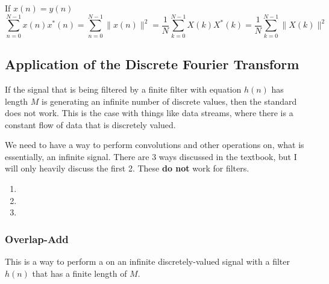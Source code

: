 If $x(n) = y(n)$
\begin{equation}\label{eq:DFT_Properties-Parsevals_Theorem-Magnitude}
  \sum\limits_{n=0}^{N-1}x(n) x^{*}(n) = \sum\limits_{n=0}^{N-1} \lVert x(n) \rVert^{2} = \frac{1}{N} \sum\limits_{k=0}^{N-1} X(k)X^{*}(k) = \frac{1}{N} \sum\limits_{k=0}^{N-1} \lVert X(k) \rVert^{2}
\end{equation}

\subsection{Application of the Discrete Fourier Transform}\label{subsec:DFT_Application}
If the signal that is being filtered by a finite filter with equation $h(n)$ has length $M$ is generating an infinite number of discrete values, then the standard  does not work.
This is the case with things like data streams, where there is a constant flow of data that is discretely valued.

We need to have a way to perform convolutions and other operations on, what is essentially, an infinite signal.
There are 3 ways discussed in the textbook, but I will only heavily discuss the first 2.
These \textbf{do not} work for  filters.
\begin{enumerate}[noitemsep]
\item {}
\item {}
\item {}
\end{enumerate}

\subsubsection{Overlap-Add}\label{subsubsec:DFT_Application-Overlap_Add}
This is a way to perform a  on an infinite discretely-valued signal with a filter $h(n)$ that has a finite length of $M$.

